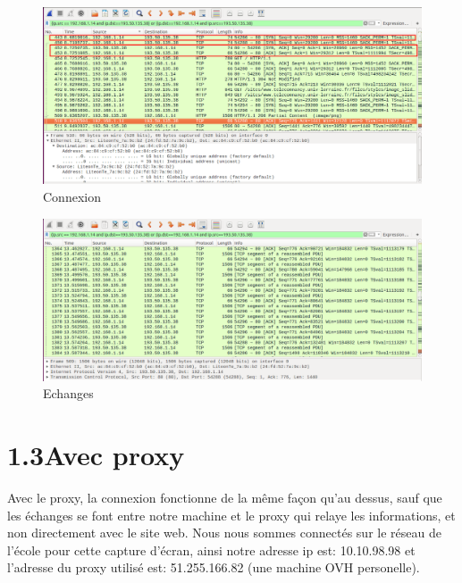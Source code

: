 \documentclass[12pt, a4paper]{report}
\begin{document}
\begin{figure}[p]
   \caption{\label{étiquette} Connexion}
   \includegraphics[scale=0.38]{Images/Connexion.png}
\end{figure}

\begin{figure}[p]
   \caption{\label{étiquette} Echanges}
   \includegraphics[scale=0.38]{Images/Echange.png}
\end{figure}


\newpage

\section*{\hspace{0.6cm}1.3\hspace{0.6cm}Avec proxy}

\hspace{1cm}Avec le proxy, la connexion fonctionne de la même façon qu'au dessus, sauf que les échanges se font entre notre machine et le proxy qui relaye les informations, et non directement avec le site web. Nous nous sommes connectés sur le réseau de l'école pour cette capture d'écran, ainsi notre adresse ip est: 10.10.98.98 et l'adresse du proxy utilisé est: 51.255.166.82 (une machine OVH personelle).\\
\end{document}
